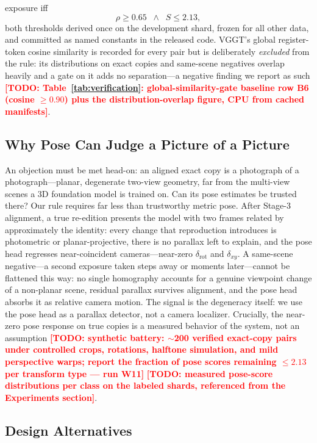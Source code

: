 \documentclass[letterpaper]{article} %
\newcommand{\todo}[1]{\textcolor{red}{\textbf{[TODO: #1]}}}
\begin{document}
exposure iff
\begin{equation}
\rho \ge 0.65 \;\;\wedge\;\; S \le 2.13,
\label{eq:decision}
\end{equation}
both thresholds derived once on the development shard, frozen for all other
data, and committed as named constants in the released code. VGGT's global
register-token cosine similarity is recorded for every pair but is
deliberately \emph{excluded} from the rule: its distributions on exact
copies and same-scene negatives overlap heavily and a gate on it adds no
separation---a negative finding we report as such
\todo{Table~\ref{tab:verification}: global-similarity-gate baseline row B6
(cosine $\ge 0.90$) plus the distribution-overlap figure, CPU from cached
manifests}.

\subsection{Why Pose Can Judge a Picture of a Picture}

An objection must be met head-on: an aligned exact copy is a photograph of
a photograph---planar, degenerate two-view geometry, far from the
multi-view scenes a 3D foundation model is trained on. Can its pose
estimates be trusted there? Our rule requires far less than trustworthy
metric pose. After Stage-3 alignment, a true re-edition presents the model
with two frames related by approximately the identity: every change that
reproduction introduces is photometric or planar-projective, there is no
parallax left to explain, and the pose head regresses near-coincident
cameras---near-zero $\delta_{\mathrm{rot}}$ and $\delta_{xy}$. A same-scene
negative---a second exposure taken steps away or moments later---cannot be
flattened this way: no single homography accounts for a genuine viewpoint
change of a non-planar scene, residual parallax survives alignment, and the
pose head absorbs it as relative camera motion. The signal is the
degeneracy itself: we use the pose head as a parallax detector, not a
camera localizer. Crucially, the near-zero pose response on true copies is
a measured behavior of the system, not an assumption \todo{synthetic
battery: $\sim$200 verified exact-copy pairs under controlled crops,
rotations, halftone simulation, and mild perspective warps; report the
fraction of pose scores remaining $\le 2.13$ per transform type --- run
W11} \todo{measured pose-score distributions per class on the labeled
shards, referenced from the Experiments section}.

\subsection{Design Alternatives}
\end{document}
